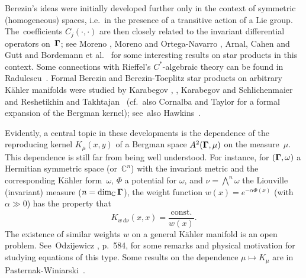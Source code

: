 \documentclass[11pt]{amsart}
\numberwithin{equation}{section}
\theoremstyle{remark}
\newcommand\Omg{{\bigam}}   %
\newcommand{\CC}{\C}
\newcommand{\bigam}{\mbox{\boldmath $\Gamma$}}
\newcommand{\C}{\mathbb C}
\begin{document}
Berezin's ideas were initially developed further only in the context of
symmetric (homogeneous) spaces, i.e.~in the presence of a transitive action of
a Lie group. The~coefficients $C_j(\cdot,\cdot)$ are then closely related to
the invariant differential operators on~$\Omg$; see Moreno \cite{bib:Mor},
Moreno and Ortega-Navarro \cite{bib:MorON}, Arnal, Cahen and Gutt
\cite{bib:Arn} and Bordemann et al.~\cite{bib:BorAL} for some interesting
results on star products
in this context. Some connections with Rieffel's $C^*$-algebraic theory can be
found in Radulescu~\cite{bib:Radul}. Formal Berezin and Berezin-Toeplitz star
products on arbitrary K\"ahler manifolds were studied by Karabegov
\cite{bib:KarA}, \cite{bib:KarCf}, Karabegov and Schlichenmaier
\cite{bib:KaSchli} and Reshetikhin and Takhtajan~\cite{bib:ReTa} (cf.~also
Cornalba and Taylor \cite{bib:CornTay} for a formal expansion of the Bergman
kernel);  see~also Hawkins~\cite{bib:Hawk}.

Evidently, a central topic in these developments is the dependence of the
reproducing kernel $K_\mu(x,y)$ of a Bergman space $A^2(\Omg,\mu)$ on the
measure~$\mu$. This dependence is still far from being well understood. For
instance, for $(\Omg,\omega)$ a Hermitian symmetric space (or~$\CC^n$) with the
invariant metric and the corresponding K\"ahler form~$\omega$, $\Phi$ a
potential for $\omega$, and $\nu=\bigwedge^n\omega$ the Liouville (invariant)
measure ($n=\dim_\CC\Omg$), the weight function $w(x)=e^{-\alpha\Phi(x)}$
(with~$\alpha\gg0$) has the property that
$$ K_{w\,d\nu}(x,x) = \frac{\text{const.}}{w(x)} .  $$
The existence of similar weights $w$ on a general K\"ahler manifold is an open
problem. See~Odzi\-je\-wicz \cite{bib:OdzijA}, p.~584, for some remarks and
physical motivation for studying equations of this type. Some results on the
dependence $\mu\mapsto K_\mu$ are in Pasternak-Winiarski~\cite{bib:PWb}.
\end{document}
